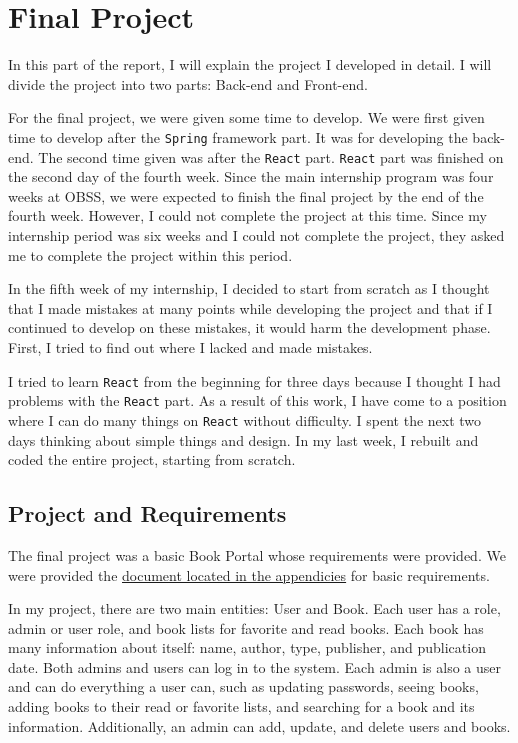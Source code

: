 \section{Final Project}
\label{final-project}

In this part of the report, I will explain the project I developed in detail. I will divide the project into two parts: Back-end and Front-end.

For the final project, we were given some time to develop. We were first given time to develop after the \texttt{Spring} framework part. It was for developing the back-end. The second time given was after the \texttt{React} part. \texttt{React} part was finished on the second day of the fourth week. Since the main internship program was four weeks at OBSS, we were expected to finish the final project by the end of the fourth week. However, I could not complete the project at this time. Since my internship period was six weeks and I could not complete the project, they asked me to complete the project within this period.

In the fifth week of my internship, I decided to start from scratch as I thought that I made mistakes at many points while developing the project and that if I continued to develop on these mistakes, it would harm the development phase. First, I tried to find out where I lacked and made mistakes.

I tried to learn \texttt{React} from the beginning for three days because I thought I had problems with the \texttt{React} part. As a result of this work, I have come to a position where I can do many things on \texttt{React} without difficulty. I spent the next two days thinking about simple things and design. In my last week, I rebuilt and coded the entire project, starting from scratch.

\subsection{Project and Requirements}

The final project was a basic Book Portal whose requirements were provided. We were provided the \hyperref[book-portal]{document located in the appendicies} for basic requirements.

In my project, there are two main entities: User and Book. Each user has a role, admin or user role, and book lists for favorite and read books. Each book has many information about itself: name, author, type, publisher, and publication date. Both admins and users can log in to the system. Each admin is also a user and can do everything a user can, such as updating passwords, seeing books, adding books to their read or favorite lists, and searching for a book and its information. Additionally, an admin can add, update, and delete users and books.




